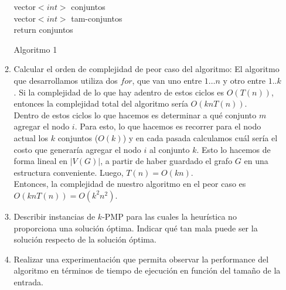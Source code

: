 \documentclass[11pt, a4paper, twoside]{article}
\begin{document}
\begin{enumerate}
\begin{enumerate}
		\begin{algorithm}[H]
		  vector$<int>$ conjuntos \\
		  vector$<int>$ tam-conjuntos \\
		  return conjuntos
		\caption{Algoritmo 1}
		\end{algorithm}
		
		\item Calcular el orden de complejidad de peor caso del algoritmo:
		El algoritmo que desarrollamos utiliza dos $for$, que van uno entre $1 \dots n$ y otro entre $1..k$.
		Si la complejidad de lo que hay adentro de estos ciclos es $O(T(n))$, entonces la complejidad total
		del algoritmo sería $O(knT(n))$. \\
		Dentro de estos ciclos lo que hacemos es determinar a qué conjunto $m$ agregar el nodo $i$. Para esto,
		lo que hacemos es recorrer para el nodo actual los $k$ conjuntos ($O(k)$) y en cada pasada calculamos 
		cuál sería el costo que generaría agregar el nodo $i$ al conjunto $k$. Esto lo hacemos de forma lineal 
		en $|V(G)|$, a partir de haber guardado el grafo $G$ en una estructura conveniente. Luego, 
		$T(n) = O(kn)$. \\
		Entonces, la complejidad de nuestro algoritmo en el peor caso es $ O(knT(n)) = O(k^2 n^2)$.
		
		\item Describir instancias de $k$-PMP para las cuales la heurística no proporciona una solución
		óptima. Indicar qué tan mala puede ser la solución respecto de la solución óptima.
		
		
		\item Realizar una experimentación que permita observar la performance del algoritmo en términos
		de tiempo de ejecución en función del tamaño de la entrada.
    \end{enumerate}
\end{enumerate}





\end{document}
